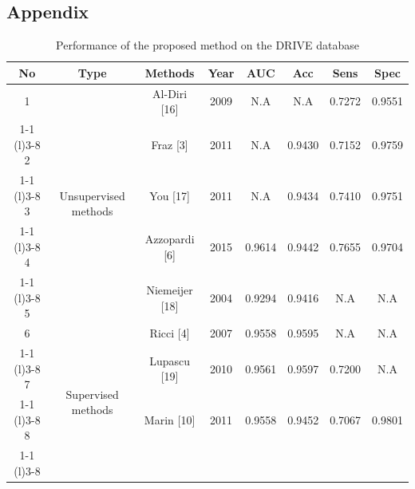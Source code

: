 \documentclass{article}
\begin{document}
\begin{appendices}  
\section{Appendix}
  
\begin{table}[h]
\centering
\caption{Performance of the proposed method on the DRIVE database}
\label{my-label}
\begin{tabular}{@{}cccccccc@{}}
\toprule
No & Type                                   & Methods                  & Year          & AUC             & Acc             & Sens            & Spec            \\ \midrule
1  & \multirow{5}{*}{Unsupervised methods}  & Al-Diri {[}16{]}         & 2009          & N.A             & N.A             & 0.7272          & 0.9551          \\ \cmidrule(r){1-1} \cmidrule(l){3-8} 
2  &                                        & Fraz {[}3{]}             & 2011          & N.A             & 0.9430          & 0.7152          & 0.9759          \\ \cmidrule(r){1-1} \cmidrule(l){3-8} 
3  &                                        & You {[}17{]}             & 2011          & N.A             & 0.9434          & 0.7410          & 0.9751          \\ \cmidrule(r){1-1} \cmidrule(l){3-8} 
4  &                                        & Azzopardi {[}6{]}       & 2015          & 0.9614          & 0.9442          & 0.7655          & 0.9704          \\ \cmidrule(r){1-1} \cmidrule(l){3-8} 
5 &                                        & Niemeijer {[}18{]}       & 2004          & 0.9294          & 0.9416          & N.A             & N.A             \\ \midrule
6 & \multirow{10}{*}{Supervised methods}              & Ricci {[}4{]}            & 2007          & 0.9558          & 0.9595          & N.A             & N.A             \\ \cmidrule(r){1-1} \cmidrule(l){3-8} 
7 &                                        & Lupascu {[}19{]}         & 2010          & 0.9561          & 0.9597          & 0.7200          & N.A             \\ \cmidrule(r){1-1} \cmidrule(l){3-8} 
8 &                                        & Marin {[}10{]}           & 2011          & 0.9558          & 0.9452          & 0.7067          & 0.9801          \\ \cmidrule(r){1-1} \cmidrule(l){3-8} 

\end{tabular}
\end{table}
\end{appendices}
\end{document}

